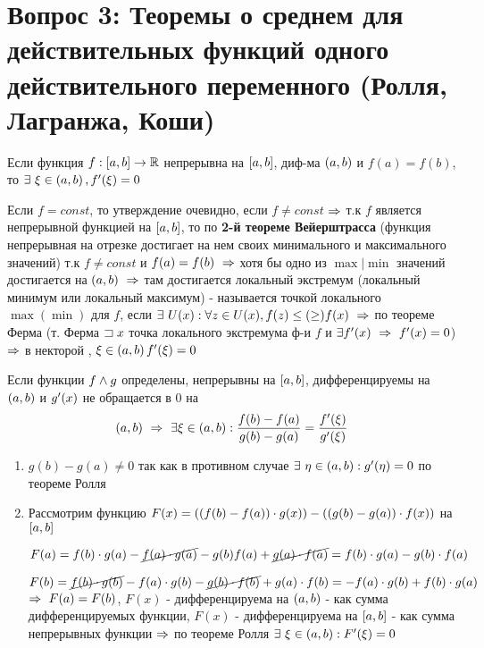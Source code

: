 \section{Вопрос 3: Теоремы о среднем для действительных функций одного действительного переменного (Ролля, Лагранжа, Коши)}

\begin{proofs}
	Если функция $f: \left[ a,b\right] \to \mathbb{R}$ непрерывна на $\left[ a,b\right]$, диф-ма $\left( a,b\right)$ и $f(a) = f(b)$, то $\exists \ \xi \in \left( a,b\right), f^{\prime}(\xi) = 0$

	\begin{dokvo}
		Если $f= const$, то утверждение очевидно, если $f \neq const$ $\Rightarrow$ т.к $f$ является непрерывной функцией на $\left[ a,b\right]$, то по \textbf{2-й теореме Вейерштрасса} (функция непрерывная на отрезке достигает на нем своих минимального и максимального значений) т.к $f \neq const$ и $f(a) = f(b) \ \Rightarrow$ хотя бы одно из $\max|\min$ значений достигается на $\skobk{a,b} \ \sledue$ там достигается локальный экстремум (локальный минимум или локальный максимум) -  называется точкой локального $\max(\min)$ для $f$, если $\exists \ U(x): \forall z \in U(x), f(z) \leq (\geq) f(x) \ \Rightarrow$ по теореме Ферма (т. Ферма $\sqsupset x$ точка локального экстремума ф-и $f$ и $\exists f^{\shtrih}(x)\ \sledue \ f^{\shtrih}(x)=0$) $\Rightarrow$ в некторой \vtochke{\xi}, $\xi \in \left( a,b\right) f^{\prime}(\xi) = 0$
	\end{dokvo}
\end{proofs}

\begin{proofs}
	Если функции $f \wedge g$ определены, непрерывны на $\left[ a,b\right]$, дифференцируемы на $\left( a,b\right)$ и $g^{\prime}(x)$  не обращается в $0$ на $$\left( a,b\right) \ \Rightarrow \ \exists \xi \in \left( a,b\right): \frac{f(b)-f(a)}{g(b)-g(a)} = \frac{f^{\prime}(\xi)}{g^{\prime}(\xi)}$$

	\begin{dokvo}
		\begin{enumerate}
			\item $g(b) - g(a) \neq 0$ так как в противном случае $\exists \ \eta \in \left( a,b\right): g^{\prime}(\eta) = 0$ по теореме Ролля
			\item Рассмотрим функцию $F(x) = \left( \left( f(b)-f(a)\right)\cdot g(x)\right) - \left( \left( g(b)-g(a)\right)\cdot f(x)\right)$ на $\left[ a,b\right]$

			$F(a) = f(b)\cdot g(a) - \cancel{f(a)\cdot g(a)} - g(b)f(a) + \cancel{g(a)\cdot f(a)} = f(b)\cdot g(a)-g(b)\cdot f(a)$

			$F(b) = \cancel{f(b)\cdot g(b)} - f(a)\cdot g(b) - \cancel{g(b)\cdot f(b)} + g(a)\cdot f(b) = -f(a)\cdot g(b)+f(b)\cdot g(a)$ $\Rightarrow \ F(a) = F(b)$, $F(x)$ - дифференцируема на $\left( a,b\right)$ - как сумма дифференцируемых функции, $F(x)$ - дифференцируема на $\left[ a,b\right]$ - как сумма непрерывных функции $\Rightarrow$ по теореме Ролля $\exists \ \xi \in \left( a,b\right): F^{\prime}(\xi) = 0$
		\end{enumerate}
	\end{dokvo}
\end{proofs}
